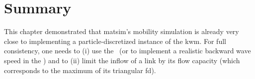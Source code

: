 \section{\label{sec:kinematicwaves-summary}Summary}
This chapter demonstrated that \gls{matsim}'s mobility simulation is already
very close to implementing a particle-discretized instance of the
\gls{kwm}. For full consistency, one needs to (i) use the \DOUBLEQUEUESIM\ 
(or to implement a realistic backward wave speed in the \SINGLEQUEUESIM)
and to (ii) limit the inflow of a link by its flow capacity (which
corresponds to the maximum of its triangular \gls{fd}). 
% 
% 


